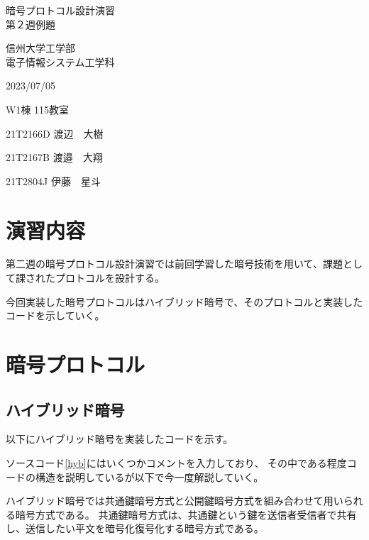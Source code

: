 \documentclass[a4paper,11pt,titlepage,dvipdfmx]{jsarticle}
\begin{document}

\begin{titlepage}
\noindent
\vspace{6cm}
\begin{center}
\begin{LARGE}
暗号プロトコル設計演習 \\
第２週例題
\end{LARGE}
\end{center}
\vspace{6cm}
\begin{flushright}
信州大学工学部 \\
電子情報システム工学科 \\
\begin{description}
\setlength{\leftskip}{8.9cm}
\item[　　実験日:] 2023/07/05
\item[　実験場所:] W1棟 115教室
\item[　　実験者:] 21T2166D 渡辺　大樹
\item[共同実験者:] 21T2167B 渡邉　大翔
\item[　　　　　 ] 21T2804J 伊藤　星斗
\end{description}
\end{flushright}
\end{titlepage}

\section{演習内容}
第二週の暗号プロトコル設計演習では前回学習した暗号技術を用いて、課題として課されたプロトコルを設計する。

今回実装した暗号プロトコルはハイブリッド暗号で、そのプロトコルと実装したコードを示していく。

\section{暗号プロトコル}
\subsection{ハイブリッド暗号}
以下にハイブリッド暗号を実装したコードを示す。


ソースコード\ref{hyb}にはいくつかコメントを入力しており、
その中である程度コードの構造を説明しているが以下で今一度解説していく。

ハイブリッド暗号では共通鍵暗号方式と公開鍵暗号方式を組み合わせて用いられる暗号方式である。
共通鍵暗号方式は、共通鍵という鍵を送信者受信者で共有し、送信したい平文を暗号化復号化する暗号方式である。
\end{document}
